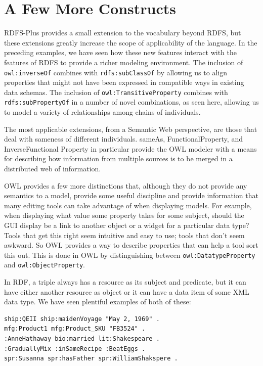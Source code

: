 \section{A Few More Constructs}

RDFS-Plus provides a small extension to the vocabulary beyond RDFS, but
these extensions greatly increase the scope of applicability of the
language. In the preceding examples, we have seen how these new features
interact with the features of RDFS to provide a richer modeling
environment. The inclusion of \texttt{owl:inverseOf} combines with
\texttt{rdfs:subClassOf} by allowing us to align
properties that might not have been expressed in compatible ways in
existing data schemas. The inclusion of \texttt{owl:TransitiveProperty} combines
with \texttt{rdfs:subPropertyOf} in a number of novel combinations, as seen here,
allowing us to model a variety of relationships among chains of
individuals.

The most applicable extensions, from a Semantic Web perspective, are
those that deal with sameness of different individuals. sameAs,
FunctionalProperty, and InverseFunctional Property in particular provide
the OWL modeler with a means for describing how information from
multiple sources is to be merged in a distributed web of information.

OWL provides a few more distinctions that, although they do not provide
any semantics to a model, provide some useful discipline and provide
information that many editing tools can take advantage of when
displaying models. For example, when displaying what value some property
takes for some subject, should the GUI display be a link to another
object or a widget for a particular data type? Tools that get this right
seem intuitive and easy to use; tools that don't seem awkward. So OWL
provides a way to describe properties that can help a tool sort this
out. This is done in OWL by distinguishing between \texttt{owl:DatatypeProperty}
and \texttt{owl:ObjectProperty}.

In RDF, a triple always has a resource as its subject and predicate, but
it can have either another
resource as object or it can have a data item of some XML data type. We
have seen plentiful examples of both of these:

\begin{lstlisting}
ship:QEII ship:maidenVoyage "May 2, 1969" .
mfg:Product1 mfg:Product_SKU "FB3524" .
:AnneHathaway bio:married lit:Shakespeare .
:GraduallyMix :inSameRecipe :BeatEggs .
spr:Susanna spr:hasFather spr:WilliamShakspere .
\end{lstlisting}

